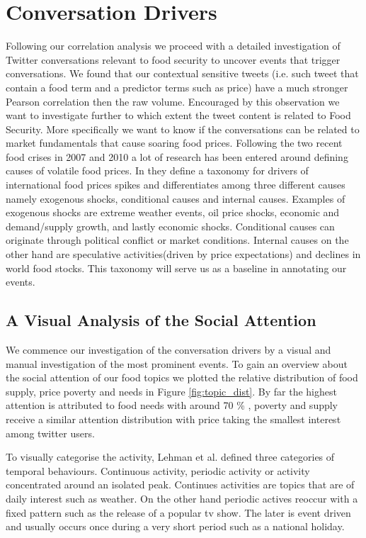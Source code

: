  \section{Conversation Drivers}
 \label{conversation}


Following our correlation analysis we proceed with a detailed investigation of Twitter conversations relevant to food security to uncover events that trigger conversations. We found that our contextual sensitive tweets (i.e. such tweet that contain a food term and a predictor terms such as price) have a much stronger Pearson correlation then the raw volume. Encouraged by this observation we want to investigate further to which extent the tweet content is related to Food Security. More specifically we want to know if the conversations can be related to market fundamentals that cause soaring food prices. Following the two recent food crises in 2007 and 2010 a lot of research has been entered around defining causes of volatile food prices.  In \cite{Tadesse2014} they define a taxonomy for drivers of  international food prices spikes and differentiates among three different causes namely exogenous shocks, conditional causes and internal causes. Examples of exogenous shocks are extreme weather events, oil price shocks, economic and demand/supply growth, and lastly economic shocks. Conditional causes can originate through political conflict or market conditions. Internal causes on the other hand are speculative activities(driven by price expectations) and declines in world food stocks. This taxonomy will serve us as a baseline in annotating our events. 



\subsection{A Visual Analysis of the Social Attention}

We commence our investigation of the conversation drivers by a visual and manual investigation of the most prominent events. To gain an overview about the social attention of our food topics we plotted the relative distribution of food supply, price poverty and needs in Figure \ref{fig:topic_dist}. By far the highest attention is attributed to food needs with around 70 \% , poverty and supply receive a similar attention distribution with price taking the smallest interest among twitter users. 

To visually categorise the activity, Lehman et al. \cite{Lehmann2012} defined three categories of temporal behaviours. Continuous activity, periodic activity or activity concentrated around an isolated peak. Continues activities are topics that are of daily  interest such as weather. On the other hand periodic actives reoccur with a fixed pattern such as the release of a popular tv show. The later is event driven and usually occurs once during a very short period such as a national holiday. 


